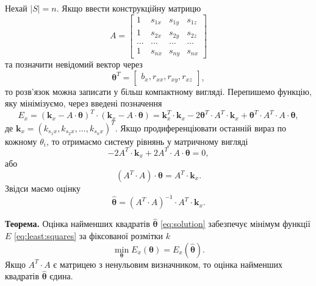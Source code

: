 Нехай $ \left| S \right| = n$.
Якщо ввести конструкційну матрицю \cite{hudson:least-squares}
\begin{equation*}
  A =
  \begin{bmatrix}
    1      & s_{1x} & s_{1y} & s_{1z} \\
    1      & s_{2x} & s_{2y} & s_{2z} \\
    \dotsc & \dotsc & \dotsc & \dotsc \\
    1      & s_{nx} & s_{ny} & s_{nx}
  \end{bmatrix}
\end{equation*}
та позначити невідомий вектор через
\begin{equation*}
   \boldsymbol{\theta}^T =
   \begin{bmatrix}
     b_x, r_{xx}, r_{xy}, r_{xz}
   \end{bmatrix},
\end{equation*}
то розв'язок можна записати у більш компактному вигляді.
Перепишемо функцію, яку мінімізуємо, через введені позначення
\begin{equation}\label{eq:energy_x}
  E_x =
  \left( \boldsymbol{k}_x - A \cdot \boldsymbol{\theta} \right)^T \cdot
  \left( \boldsymbol{k}_x - A \cdot \boldsymbol{\theta} \right) =
  \boldsymbol{k}_x^T \cdot \boldsymbol{k}_x - 2 \boldsymbol{\theta}^T \cdot A^T \cdot \boldsymbol{k}_x +
  \boldsymbol{\theta}^T \cdot A^T \cdot A \cdot \boldsymbol{\theta},
\end{equation}
де $\boldsymbol{k}_x = \left( k_{s_1 x}, k_{s_2 x}, \dotsc, k_{s_n x} \right)^T $.
Якщо продиференціювати останній вираз по кожному $\theta_i$,
то отримаємо систему рівнянь у матричному вигляді
\begin{equation*}
  -2A^T \cdot \boldsymbol{k}_x + 2A^T \cdot A \cdot \boldsymbol{\theta} = 0,
\end{equation*}
або
\begin{equation}\label{eq:equation_theta}
  \left( A^T \cdot A \right) \cdot \boldsymbol{\theta} = A^T \cdot \boldsymbol{k}_x.
\end{equation}
Звідси маємо оцінку
\begin{equation}\label{eq:solution}
  \hat{\boldsymbol{\theta}} =
  \left( A^T \cdot A \right)^{-1} \cdot A^T \cdot \boldsymbol{k}_x.
\end{equation}

\textbf{Теорема.}
Оцінка найменших квадратів $\hat{\boldsymbol{\theta}}$
\eqref{eq:solution} забезпечує мінімум функції $E$ \eqref{eq:least:squares}
за фіксованої розмітки $k$
\begin{equation*}
  \min \limits_{\boldsymbol{\theta}} E_x \left( \boldsymbol{\theta} \right) =
  E_x \left( \hat{\boldsymbol{\theta}} \right).
\end{equation*}
Якщо $A^T \cdot A$ є матрицею з ненульовим визначником,
то оцінка найменших квадратів $\hat{\boldsymbol{\theta}}$ єдина.

